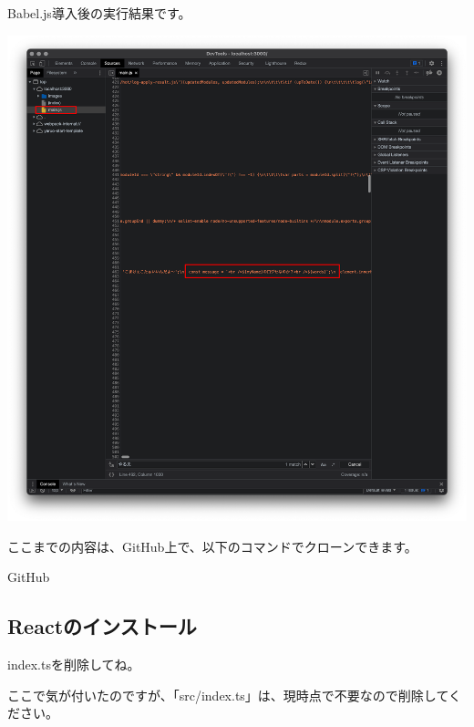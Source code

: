 \clearpage


Babel.js導入後の実行結果です。

\begin{reviewimage}%
\includegraphics[width=0.9\maxwidth]{./images/02-create-react-app/babel06.png}%
\label{image:02-create-react-app:babel06}
\end{reviewimage}
\begin{starternote}[]{}

ここまでの内容は、GitHub上で、以下のコマンドでクローンできます。

\def\startercodeblockfontsize{}
\begin{starterterminal}[]{GitHub}\end{starterterminal}
\end{starternote}

\subsection{Reactのインストール}
\keeplastskip{
  \label{sec:2-2-7}
  \label{sec04-react}
  \par\nobreak
}
\begin{starterwarning}{index.tsを削除してね。}

ここで気が付いたのですが、「src/index.ts」は、現時点で不要なので削除してください。

\end{starterwarning}

